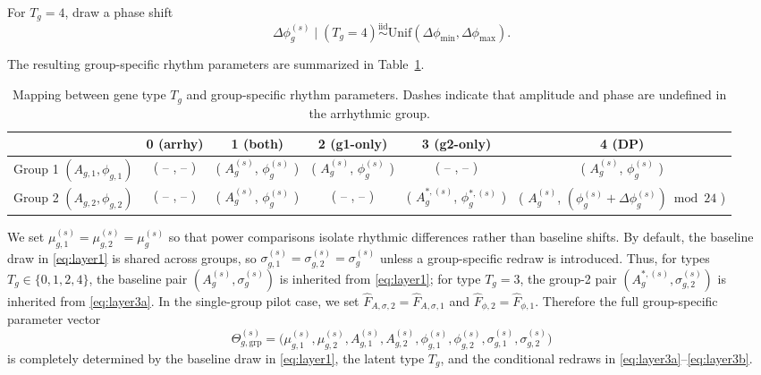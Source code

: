 \documentclass{article}
\begin{document}
For $T_g=4$, draw a phase shift
\begin{equation}
\Delta\phi_g^{(s)}\mid(T_g=4)\overset{\mathrm{iid}}{\sim}
\mathrm{Unif}(\Delta\phi_{\min},\Delta\phi_{\max}).
\label{eq:layer3b}
\end{equation}


The resulting group-specific rhythm parameters are summarized in
Table~\ref{tab:type_mapping}.

\begin{table}[H]
\centering
\small
\begin{tabular}{c|ccccc}
\toprule
 & 0 (arrhy) & 1 (both) & 2 (g1-only) & 3 (g2-only) & 4 (DP) \\
\midrule
Group 1 $(A_{g,1},\phi_{g,1})$
& ( -- , -- )
& ( $A_g^{(s)}$, $\phi_g^{(s)}$ )
& ( $A_g^{(s)}$, $\phi_g^{(s)}$ )
& ( -- , -- )
& ( $A_g^{(s)}$, $\phi_g^{(s)}$ ) \\

Group 2 $(A_{g,2},\phi_{g,2})$
& ( -- , -- )
& ( $A_g^{(s)}$, $\phi_g^{(s)}$ )
& ( -- , -- )
& ( $A_g^{*,(s)}$, $\phi_g^{*,(s)}$ )
& ( $A_g^{(s)}$, $(\phi_g^{(s)}+\Delta\phi_g^{(s)})\bmod 24$ ) \\
\bottomrule
\end{tabular}
\caption{Mapping between gene type $T_g$ and group-specific rhythm parameters.
Dashes indicate that amplitude and phase are undefined in the arrhythmic group.}
\label{tab:type_mapping}
\end{table}

We set $\mu_{g,1}^{(s)}=\mu_{g,2}^{(s)}=\mu_g^{(s)}$ so that power comparisons
isolate rhythmic differences rather than baseline shifts. By default, the
baseline draw in \eqref{eq:layer1} is shared across groups, so
$\sigma_{g,1}^{(s)}=\sigma_{g,2}^{(s)}=\sigma_g^{(s)}$ unless a group-specific
redraw is introduced. Thus, for types $T_g\in\{0,1,2,4\}$, the baseline pair
$(A_g^{(s)},\sigma_g^{(s)})$ is inherited from \eqref{eq:layer1}; for type
$T_g=3$, the group-2 pair $(A_g^{*,(s)},\sigma_{g,2}^{(s)})$ is inherited from
\eqref{eq:layer3a}. In the single-group pilot case, we set
$\hat{F}_{A,\sigma,2}=\hat{F}_{A,\sigma,1}$ and
$\hat{F}_{\phi,2}=\hat{F}_{\phi,1}$. Therefore the full group-specific
parameter vector
\[
\Theta_{g,\mathrm{grp}}^{(s)}
=
\bigl(
\mu_{g,1}^{(s)},\mu_{g,2}^{(s)},
A_{g,1}^{(s)},A_{g,2}^{(s)},
\phi_{g,1}^{(s)},\phi_{g,2}^{(s)},
\sigma_{g,1}^{(s)},\sigma_{g,2}^{(s)}
\bigr)
\]
is completely determined by the baseline draw in \eqref{eq:layer1}, the latent
type $T_g$, and the conditional redraws in
\eqref{eq:layer3a}--\eqref{eq:layer3b}.
\end{document}
